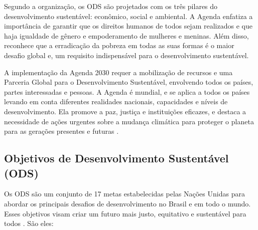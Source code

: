 Segundo a organização, os ODS são projetados com os três pilares do desenvolvimento sustentável: econômico, social e ambiental. A Agenda enfatiza a importância de garantir que os direitos humanos de todos sejam realizados e que haja igualdade de gênero e empoderamento de mulheres e meninas. Além disso, reconhece que a erradicação da pobreza em todas as suas formas é o maior desafio global e, um requisito indispensável para o desenvolvimento sustentável.

A implementação da Agenda 2030 requer a mobilização de recursos e uma Parceria Global para o Desenvolvimento Sustentável, envolvendo todos os países, partes interessadas e pessoas. A Agenda é mundial, e se aplica a todos os países levando em conta diferentes realidades nacionais, capacidades e níveis de desenvolvimento. Ela promove a paz, justiça e instituições eficazes, e destaca a necessidade de ações urgentes sobre a mudança climática para proteger o planeta para as gerações presentes e futuras \cite{onu2015agenda2030}.

\subsection{Objetivos de Desenvolvimento Sustentável (ODS)}

Os ODS são um conjunto de 17 metas estabelecidas pelas Nações Unidas para abordar os principais desafios de desenvolvimento no Brasil e em todo o mundo. Esses objetivos visam criar um futuro mais justo, equitativo e sustentável para todos \cite{onu2015ods}. São eles:

